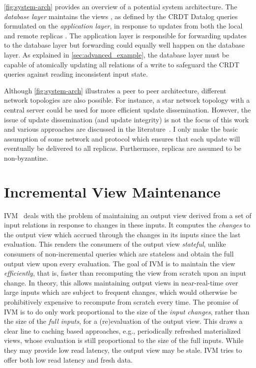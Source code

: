 

\ref{fig:system-arch} provides an overview of a potential system architecture.
The \emph{database layer} maintains the views \deltaO{},
as defined by the \ac{CRDT} Datalog queries formulated on the \emph{application layer},
in response to updates from both the local  and remote replicas
.
The application layer is responsible for forwarding updates to the database layer
but forwarding could equally well happen on the database layer.
As explained in \ref{sec:advanced_example}, the database layer must be capable
of atomically updating all relations of a write to safeguard the \ac{CRDT} queries
against reading inconsistent input state.

Although \ref{fig:system-arch} illustrates a peer to peer architecture,
different network topologies are also possible.
For instance, a star network topology with a central server could be used
for more efficient update dissemination.
However, the issue of update dissemination (and update integrity) is not the focus
of this work and various approaches are discussed in the literature~\cite{
	auvolat2019merkle, sanjuan2020merkle, kleppmann2024bluesky,
	kleppmann2022making}.
I only make the basic assumption of some network and protocol
which ensures that each update will eventually be delivered to all replicas.
Furthermore, replicas are assumed to be non-byzantine.

\section{Incremental View Maintenance}\label{sec:ivm}

\Acf{IVM}~\cite{gupta1995maintenance} deals with the problem of maintaining
an output view derived from a set of input relations in response to changes
in these inputs.
It computes the \emph{changes} to the output view which accrued through
the changes in its inputs since the last evaluation.
This renders the consumers of the output view \emph{stateful},
unlike consumers of non-incremental queries which are stateless
and obtain the full output view upon every evaluation.
The goal of \ac{IVM} is to maintain the view \emph{efficiently}, that is,
faster than recomputing the view from scratch upon an input change.
In theory, this allows maintaining output views in near-real-time over large
inputs which are subject to frequent changes, which would otherwise be
prohibitively expensive to recompute from scratch every time.
The promise of \ac{IVM} is to do only work proportional to the
size of the \emph{input changes}, rather than the size of the \emph{full inputs},
for a (re)evaluation of the output view.
This draws a clear line to caching based approaches, e.g., periodically
refreshed materialized views, whose evaluation is still proportional
to the size of the full inputs.
While they may provide low read latency, the output view may be stale.
\ac{IVM} tries to offer both low read latency and fresh data.

